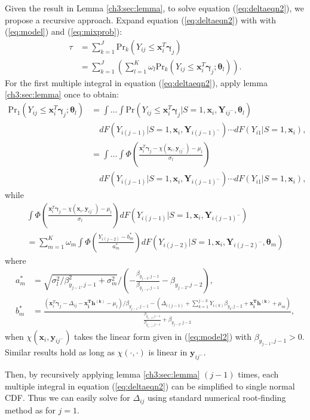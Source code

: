 \documentclass[useAMS,usenatbib,referee]{biom}
\newcommand{\prob}{\mbox{Pr}}
\begin{document}
\begin{itemize}
  Given the result in Lemma \ref{ch3:sec:lemma}, to solve equation
  (\ref{eq:deltaeqn2}), we propose a recursive approach.
Expand equation (\ref{eq:deltaeqn2}) with with (\ref{eq:model}) and (\ref{eq:mixprob}):
\begin{align*}
\tau & = \sum_{k = 1}^J\prob_k (Y_{ij} \leq \bm x_{i}^T \bm \gamma_j) \\
& = \sum_{k = 1}^J \left( \sum_{l = 1}^K \omega_{l} \prob_k (Y_{ij} \leq \bm x_{i}^T \bm \gamma_j; \bm \theta_l) \right).
\end{align*}
For the first
  multiple integral in equation (\ref{eq:deltaeqn2}), apply lemma
  \ref{ch3:sec:lemma} once to obtain:
  \begin{align*}
    \prob_1 (Y_{ij} \leq \bm x_{i}^T \bm \gamma_j; \bm \theta_l) & =
    \int\dots\int
    \prob (Y_{ij} \leq \bm x_{i}^T\bm \gamma_j | S=1, \bm x_{i}, \bm Y_{ij^{-}}, \bm \theta_l)\\
    & \quad  dF(Y_{i(j-1)}|S=1, \bm x_{i}, \bm Y_{i(j-1)^{-}}) \cdots d F (Y_{i1} | S = 1, \bm x_{i}), \\
    & = \int\dots\int \Phi \left( \frac{\bm x_{i}^T \bm \gamma_j - \chi(\bm x_{i}, \bm y_{ij^{-}}) - \mu_l}{\sigma_{l}} \right) \\
    & \quad   dF(Y_{i(j-1)}|S=1, \bm x_{i}, \bm Y_{i(j-1)^{-}}) \cdots d F (Y_{i1} | S = 1, \bm x_{i}),
\end{align*}
while
\begin{multline*}
\int \Phi \left( \frac{\bm x_{i}^T \bm \gamma_j - \chi(\bm x_{i}, \bm y_{ij^{-}}) - \mu_l}{\sigma_{l}}\right) dF(Y_{i(j-1)}|S=1, \bm x_{i}, \bm Y_{i(j-1)^{-}})  \\
 =  \sum_{m = 1}^K \omega_m\int \Phi \left( \frac{Y_{i(j-2)} - b_m^{*}}{a_m^{*}} \right) dF(Y_{i(j-2)}|S=1, \bm x_{i}, \bm Y_{i(j-2)^{-}}, \bm \theta_m)
\end{multline*}
where
\begin{align*}
a_m^{*} & = \sqrt{\sigma_l^2/\beta_{y_{j-1}, j-1}^2 + \sigma_{m}^2} \big / \left( - \frac{\beta_{y_{j-2}, j-1}}{\beta_{y_{j-1}, j-1}} - \beta_{y_{j-2}, j-2} \right), \\
b_m^{*} & = \frac{ (\bm x_i^T \bm \gamma_j - \Delta_{ij} - \bm{x_i^T h^{(k)}} - \mu_l)/\beta_{y_{j-1}, j-1} - (\Delta_{i(j-1)} + \sum_{k=1}^{j-3} Y_{i(k)} \beta_{y_k, j-2} + \bm{x_{i}^{T}h^{(k)}} + \mu_m)}{\frac{\beta_{y_{j-2}, j-1}}{\beta_{y_{j-1}, j-1}} + \beta_{y_{j-2}, j-2}},
\end{align*}
when $\chi(\bm x_i, \bm y_{ij^{-}})$ takes the linear form given in (\ref{eq:model2}) with  $\beta_{y_{j-1}, j-1} > 0$.  Similar results hold as long as $\chi(\cdot,\cdot)$ is linear in $\bm y_{ij^{-}}$.

  Then, by recursively applying lemma \ref{ch3:sec:lemma} $(j-1)$ times,
  each multiple integral in equation (\ref{eq:deltaeqn2}) can be
  simplified to single normal CDF. Thus we can easily solve for
  $\Delta_{ij}$ using standard numerical root-finding method as for $j
  = 1$.

\end{itemize}
\end{document}
